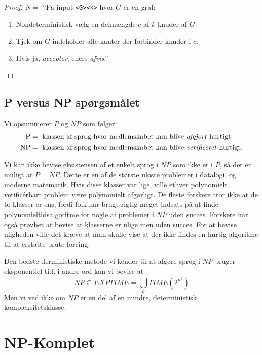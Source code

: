 \begin{proof}
	$N = $ ``På input \texttt{<G><k>} hvor $G$ er en graf:
	\begin{enumerate}
		\item Nondeterministisk vælg en delmængde $c$ af $k$ knuder af $G$.
		\item Tjek om $G$ indeholder alle kanter der forbinder knuder i $c$.
		\item Hvis ja, \textit{accepter}, ellers \textit{afvis}.''
	\end{enumerate}
\end{proof}

\subsection{P versus NP spørgsmålet}%
\label{subsec:pvsnp}

Vi opsummerer $P$ og $NP$ som følger:
\begin{align*}
	\text{P}  & = \text{ klassen af sprog hvor medlemskabet kan blive \textit{afgjort} hurtigt.}     \\
	\text{NP} & = \text{ klassen af sprog hvor medlemskabet kan blive \textit{verificeret} hurtigt.}
\end{align*}

Vi kan ikke bevise eksistensen af et enkelt sprog i $NP$ som ikke er i $P$, så det er muligt at $P = NP$. Dette er en af de største uløste problemer i datalogi, og moderne matematik. Hvis disse klasser var lige, ville ethver polynomielt verificérbart problem være polynomielt afgørligt. De fleste forskere tror ikke at de to klasser er ens, fordi folk har brugt rigtig meget indsats  på at finde polynomieltidsalgoritme for nogle af problemer i $NP$ uden succes. Forskere har også prøvbet at bevise at klasserne er ulige men uden succes. For at bevise uligheden ville det kræve at man skulle vise at der ikke findes en hurtig algoritme til at erstatte brute-forcing.

Den bedste derministiske metode vi kender til at afgøre sprog i $NP$ bruger eksponentiel tid, i andre ord kan vi bevise at
\begin{equation*}
	NP \subseteq EXPTIME = \bigcup_{k} TIME (2^{n^{k}})
\end{equation*}
Men vi ved ikke om $NP$ er en del af en mindre, deterministisk kompleksitetsklasse.

\section{NP-Komplet}%
\label{sec:npcompleteness}

